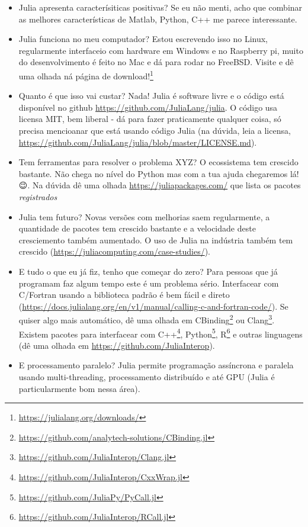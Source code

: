 \documentclass[
  notoc %
]{tufte-book}
\DeclareRobustCommand{\href}[2]{#2\footnote{\url{#1}}}
\providecommand{\tightlist}{%
  \setlength{\itemsep}{0pt}\setlength{\parskip}{0pt}
}
\begin{document}
\begin{itemize}
\tightlist
\item
  Julia apresenta caracterísiticas positivas? Se eu não menti, acho que
  combinar as melhores características de Matlab, Python, C++ me parece
  interessante.
\item
  Julia funciona no meu computador? Estou escrevendo isso no Linux,
  regularmente interfaceio com hardware em Windows e no Raspberry pi,
  muito do desenvolvimento é feito no Mac e dá para rodar no FreeBSD.
  \href{https://julialang.org/downloads/}{Visite e dê uma olhada ná
  página de download!}
\item
  Quanto é que isso vai custar? Nada! Julia é software livre e o código
  está disponível no github \url{https://github.com/JuliaLang/julia}. O
  código usa licensa MIT, bem liberal - dá para fazer praticamente
  qualquer coisa, só precisa mencioanar que está usando código Julia (na
  dúvida, leia a licensa,
  \url{https://github.com/JuliaLang/julia/blob/master/LICENSE.md}).
\item
  Tem ferramentas para resolver o problema XYZ? O ecossistema tem
  crescido bastante. Não chega no nível do Python mas com a tua ajuda
  chegaremos lá! 😉. Na dúvida dê uma olhada
  \url{https://juliapackages.com/} que lista os pacotes
  \emph{registrados}
\item
  Julia tem futuro? Novas versões com melhorias saem regularmente, a
  quantidade de pacotes tem crescido bastante e a velocidade deste
  cresciemento também aumentado. O uso de Julia na indústria também tem
  crescido (\url{https://juliacomputing.com/case-studies/}).
\item
  E tudo o que eu já fiz, tenho que começar do zero? Para pessoas que já
  programam faz algum tempo este é um problema sério. Interfacear com
  C/Fortran usando a biblioteca padrão é bem fácil e direto
  (\url{https://docs.julialang.org/en/v1/manual/calling-c-and-fortran-code/}).
  Se quiser algo mais automático, dê uma olhada em
  \href{https://github.com/analytech-solutions/CBinding.jl}{CBinding} ou
  \href{https://github.com/JuliaInterop/Clang.jl}{Clang}. Existem
  pacotes para interfacear com
  \href{https://github.com/JuliaInterop/CxxWrap.jl}{C++},
  \href{https://github.com/JuliaPy/PyCall.jl}{Python},
  \href{https://github.com/JuliaInterop/RCall.jl}{R} e outras linguagens
  (dê uma olhada em \url{https://github.com/JuliaInterop}).
\item
  E processamento paralelo? Julia permite programação assíncrona e
  paralela usando multi-threading, processamento distribuído e até GPU
  (Julia é particularmente bom nessa área).
\end{itemize}
\end{document}
